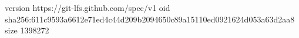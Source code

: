 version https://git-lfs.github.com/spec/v1
oid sha256:611c9593a6612e71ed4c44d209b2094650c89a15110ed0921624d053a63d2aa8
size 1398272
